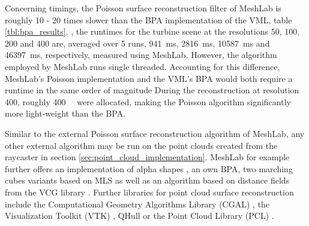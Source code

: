 Concerning timings, the Poisson surface reconstruction filter of MeshLab is roughly 10 - 20 times slower than the BPA implementation of the VML, \cf table \ref{tbl:bpa_results}.
\Eg, the runtimes for the turbine scene at the resolutions 50, 100, 200 and 400 are, averaged over 5 runs, \SI{941}{\milli\second}, \SI{2816}{\milli\second}, \SI{10587}{\milli\second} and \SI{46397}{\milli\second}, respectively, measured using MeshLab.
However, the algorithm employed by MeshLab runs single threaded.
Accounting for this difference, MeshLab's Poisson implementation and the VML's BPA would both require a runtime in the same order of magnitude
During the reconstruction at resolution 400, roughly \SI{400}{\mebi\byte} were allocated, making the Poisson algorithm significantly more light-weight than the BPA.

Similar to the external Poisson surface reconstruction algorithm of MeshLab, any other external algorithm may be run on the point clouds created from the raycaster in section \ref{sec:point_cloud_implementation}.
MeshLab for example further offers an implementation of alpha shapes \cite{alpha_shape}, an own BPA, two marching cubes variants based on MLS \cite{meshlab_mc_mls_1, meshlab_mc_mls_2} as well as an algorithm based on distance fields from the VCG library \cite{vcg}.
Further libraries for point cloud surface reconstruction include the Computational Geometry Algorithms Library (CGAL) \cite{cgal}, the Visualization Toolkit (VTK) \cite{vtk}, QHull \cite{qhull} or the Point Cloud Library (PCL) \cite{pcl}.
